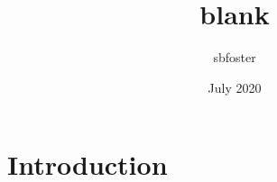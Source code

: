 \documentclass{article}
\title{blank}
\author{sbfoster }
\date{July 2020}
\begin{document}
\maketitle

\section{Introduction}
\end{document}
